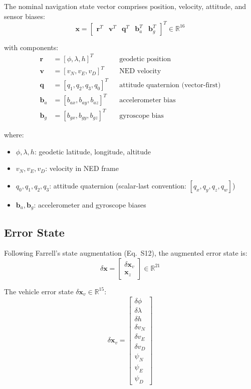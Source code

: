 \documentclass[11pt,a4paper]{article}
\newcommand{\mat}[1]{\mathbf{#1}}
\newcommand{\quat}[1]{\mathbf{#1}}
\newcommand{\Rn}{\mathbb{R}}
\begin{document}
The nominal navigation state vector comprises position, velocity, attitude, and sensor biases:
\begin{equation}
    \mat{x} = \begin{bmatrix}
        \mat{r}^T & \mat{v}^T & \quat{q}^T & \mat{b}_a^T & \mat{b}_g^T
    \end{bmatrix}^T \in \Rn^{16}
\end{equation}

with components:
\begin{align}
    \mat{r} &= [\phi, \lambda, h]^T & &\text{geodetic position} \\
    \mat{v} &= [v_N, v_E, v_D]^T & &\text{NED velocity} \\
    \quat{q} &= [q_1, q_2, q_3, q_0]^T & &\text{attitude quaternion (vector-first)} \\
    \mat{b}_a &= [b_{ax}, b_{ay}, b_{az}]^T & &\text{accelerometer bias} \\
    \mat{b}_g &= [b_{gx}, b_{gy}, b_{gz}]^T & &\text{gyroscope bias}
\end{align}

where:
\begin{itemize}
    \item $\phi, \lambda, h$: geodetic latitude, longitude, altitude
    \item $v_N, v_E, v_D$: velocity in NED frame
    \item $q_0, q_1, q_2, q_3$: attitude quaternion (scalar-last convention: $[q_x, q_y, q_z, q_w]$)
    \item $\mat{b}_a, \mat{b}_g$: accelerometer and gyroscope biases
\end{itemize}

\subsection{Error State}

Following Farrell's state augmentation (Eq.~S12), the augmented error state is:
\begin{equation}
    \delta\mat{x} = \begin{bmatrix}
        \delta\mat{x}_v \\
        \mat{x}_z
    \end{bmatrix} \in \Rn^{21}
\end{equation}

The vehicle error state $\delta\mat{x}_v \in \Rn^{15}$:
\begin{equation}
    \delta\mat{x}_v = \begin{bmatrix}
        \delta\phi \\ \delta\lambda \\ \delta h \\ \delta v_N \\ \delta v_E \\ \delta v_D \\ \psi_N \\ \psi_E \\ \psi_D
    \end{bmatrix}
\end{equation}
\end{document}
